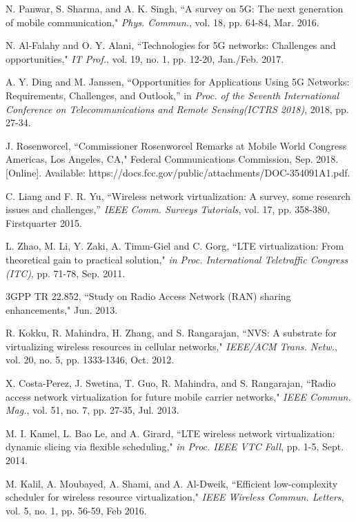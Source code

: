\documentclass[journal]{IEEEtran}
\begin{document}
\begin{thebibliography}{1}	
 N. Panwar, S. Sharma, and A. K. Singh, ``A survey on 5G: The
next generation of mobile communication," \emph{Phys. Commun.}, vol. 18, pp. 64-84, Mar. 2016.	
	
 N. Al-Falahy and O. Y. Alani, ``Technologies for 5G networks:
Challenges and opportunities," \emph{IT Prof.}, vol. 19, no. 1, pp. 12-20, Jan./Feb. 2017.	

 A. Y. Ding and M. Janssen, ``Opportunities for Applications Using 5G Networks: Requirements, Challenges, and Outlook,” in \emph{Proc. of the Seventh International Conference on Telecommunications and Remote Sensing(ICTRS 2018)}, 2018, pp. 27-34.

 J. Rosenworcel, ``Commissioner Rosenworcel Remarks at Mobile World Congress Americas, Los Angeles, CA," Federal Communications Commission, Sep. 2018. [Online]. Available: https://docs.fcc.gov/public/attachments/DOC-354091A1.pdf.
	
 C. Liang and F. R. Yu, ``Wireless network virtualization: A survey, some research issues and challenges,” \emph{IEEE Comm. Surveys Tutorials}, vol. 17, pp. 358-380, Firstquarter 2015.

L. Zhao, M. Li, Y. Zaki, A. Timm-Giel and C. Gorg, ``LTE virtualization:
From theoretical gain to practical solution," \emph{in Proc. International Teletraffic Congress (ITC)}, pp. 71-78, Sep. 2011.


3GPP TR 22.852, ``Study on Radio Access Network (RAN) sharing enhancements," Jun. 2013.

 R. Kokku, R. Mahindra, H. Zhang, and S. Rangarajan, ``NVS: A substrate for virtualizing wireless resources in cellular networks," \emph{IEEE/ACM Trans. Netw.}, vol. 20, no. 5, pp. 1333-1346, Oct. 2012.

X. Costa-Perez, J. Swetina, T. Guo, R. Mahindra, and S. Rangarajan, ``Radio access network virtualization for future mobile carrier networks," \emph{IEEE Commun. Mag.}, vol. 51, no. 7, pp. 27-35, Jul. 2013.

M. I. Kamel, L. Bao Le, and A. Girard, ``LTE wireless network virtualization: dynamic slicing via flexible scheduling," \emph{in Proc. IEEE VTC Fall}, pp. 1-5, Sept. 2014.

M. Kalil, A. Moubayed, A. Shami, and A. Al-Dweik, ``Efficient low-complexity scheduler for wireless resource virtualization," \emph{IEEE Wireless Commun. Letters}, vol. 5, no. 1, pp. 56-59, Feb 2016.
	

\end{thebibliography}
\end{document}
